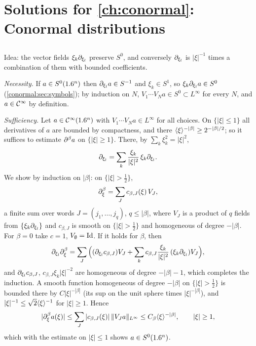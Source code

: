 \providecommand{\osc}[1]{\mathcal{I}[#1]}

\section{Solutions for \cref{ch:conormal}: Conormal distributions}\label{solutions:conormal}

\subsection*{}
Idea: the vector fields $\xi_k\partial_{\xi_l}$ preserve $S^0$, and conversely $\partial_{\xi_l}$ is
$|\xi|^{-1}$ times a combination of them with bounded coefficients.

\emph{Necessity.} If $a\in S^0(1.6^n)$ then $\partial_{\xi_l}a\in S^{-1}$ and $\xi_k\in S^1$, so
$\xi_k\partial_{\xi_l}a\in S^0$ (\cref{conormal:sec:symbols}); by induction on $N$,
$V_1\cdots V_Na\in S^0\subset L^\infty$ for every $N$, and $a\in\mathcal{C}^\infty$ by definition.

\emph{Sufficiency.} Let $a\in\mathcal{C}^\infty(1.6^n)$ with $V_1\cdots V_Na\in L^\infty$ for all choices.
On $\{|\xi|\le1\}$ all derivatives of $a$ are bounded by compactness, and there
$\langle \xi\rangle^{-|\beta|}\ge2^{-|\beta|/2}$; so it suffices to estimate $\partial^\beta a$ on
$\{|\xi|\ge1\}$. There, by $\sum_k\xi_k^2=|\xi|^2$,
\begin{equation*}
\partial_{\xi_l}=\sum_k\frac{\xi_k}{|\xi|^2}\,\xi_k\partial_{\xi_l}.
\end{equation*}
We show by induction on $|\beta|$: on $\{|\xi|>\frac12\}$,
\begin{equation*}
\partial_\xi^\beta=\sum_Jc_{\beta,J}(\xi)\,V_J,
\end{equation*}
a finite sum over words $J=(j_1,\dots,j_q)$, $q\le|\beta|$, where $V_J$ is a product of $q$
fields from $\{\xi_k\partial_{\xi_l}\}$ and $c_{\beta,J}$ is smooth on $\{|\xi|>\frac12\}$ and
homogeneous of degree $-|\beta|$. For $\beta=0$ take $c=1$, $V_\emptyset=\operatorname{Id}$. If it holds
for $\beta$, then
\begin{equation*}
\partial_{\xi_l}\partial_\xi^\beta=\sum_J\Big((\partial_{\xi_l}c_{\beta,J})V_J+\sum_kc_{\beta,J}\frac{\xi_k}
{|\xi|^2}\,(\xi_k\partial_{\xi_l})V_J\Big),
\end{equation*}
and $\partial_{\xi_l}c_{\beta,J}$, $c_{\beta,J}\xi_k|\xi|^{-2}$ are homogeneous of degree
$-|\beta|-1$, which completes the induction. A smooth function homogeneous of degree
$-|\beta|$ on $\{|\xi|>\frac12\}$ is bounded there by $C|\xi|^{-|\beta|}$ (its sup on the unit
sphere times $|\xi|^{-|\beta|}$), and $|\xi|^{-1}\le\sqrt2\langle \xi\rangle^{-1}$ for $|\xi|\ge1$. Hence
\begin{equation*}
|\partial^\beta_\xi a(\xi)|\le\sum_J|c_{\beta,J}(\xi)|\,\lVert V_Ja\rVert_{L^\infty}\le C_\beta
\langle \xi\rangle^{-|\beta|},\qquad|\xi|\ge1,
\end{equation*}
which with the estimate on $|\xi|\le1$ shows $a\in S^0(1.6^n)$.

